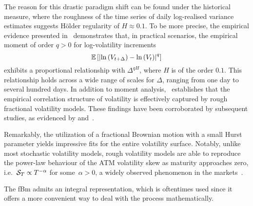 The reason for this drastic paradigm shift can be found under the historical measure, where the roughness of the time series of daily log-realised variance estimates suggests H{\"o}lder regularity of $H\approx 0.1$. To be more precise, the empirical evidence presented in~\cite{Gatheral2018VolatilityRough} demonstrates that, in practical scenarios, the empirical moment of order $q>0$ for log-volatility increments
\[
\mathbb{E}\left[\left\lvert \ln \left(V_{t+\Delta}\right)-\ln \left(V_t\right)\right\rvert^q\right]
\]
exhibits a proportional relationship with $\Delta^{q H}$, where $H$ is of the order $0.1$. This relationship holds across a wide range of scales for $\Delta$, ranging from one day to several hundred days. In addition to moment analysis,~\cite{Gatheral2018VolatilityRough} establishes that the empirical correlation structure of volatility is effectively captured by rough fractional volatility models. These findings have been corroborated by subsequent studies, as evidenced by \cite{Bennedsen2022DecouplingVolatility} and~\cite{Livieri2018RoughPrices}. 

Remarkably, the utilization of a fractional Brownian motion with a small Hurst parameter yields impressive fits for the entire volatility surface. Notably, unlike most stochastic volatility models, rough volatility models are able to reproduce the power-law behaviour of the ATM volatility skew as maturity approaches zero, i.e.~$\mathcal{S}_T \propto T^{-\alpha}$ for some~$\alpha>0$, a widely observed phenomenon in the markets~\cite{Bayer2015PricingVolatility, Gatheral2018VolatilityRough}.

The fBm admits an integral representation, which is oftentimes used since it offers a more convenient way to deal with the process mathematically.

